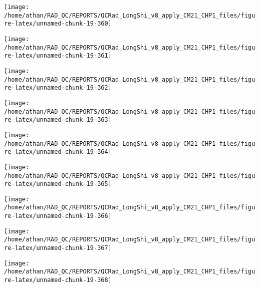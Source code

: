 \documentclass[
  10pt,
  a4paper,oneside]{article}
\begin{document}
\begin{center}\texttt{[image: /home/athan/RAD\_QC/REPORTS/QCRad\_LongShi\_v8\_apply\_CM21\_CHP1\_files/figure-latex/unnamed-chunk-19-360]} \end{center}

\begin{center}\texttt{[image: /home/athan/RAD\_QC/REPORTS/QCRad\_LongShi\_v8\_apply\_CM21\_CHP1\_files/figure-latex/unnamed-chunk-19-361]} \end{center}

\begin{center}\texttt{[image: /home/athan/RAD\_QC/REPORTS/QCRad\_LongShi\_v8\_apply\_CM21\_CHP1\_files/figure-latex/unnamed-chunk-19-362]} \end{center}

\begin{center}\texttt{[image: /home/athan/RAD\_QC/REPORTS/QCRad\_LongShi\_v8\_apply\_CM21\_CHP1\_files/figure-latex/unnamed-chunk-19-363]} \end{center}

\begin{center}\texttt{[image: /home/athan/RAD\_QC/REPORTS/QCRad\_LongShi\_v8\_apply\_CM21\_CHP1\_files/figure-latex/unnamed-chunk-19-364]} \end{center}

\begin{center}\texttt{[image: /home/athan/RAD\_QC/REPORTS/QCRad\_LongShi\_v8\_apply\_CM21\_CHP1\_files/figure-latex/unnamed-chunk-19-365]} \end{center}

\begin{center}\texttt{[image: /home/athan/RAD\_QC/REPORTS/QCRad\_LongShi\_v8\_apply\_CM21\_CHP1\_files/figure-latex/unnamed-chunk-19-366]} \end{center}

\begin{center}\texttt{[image: /home/athan/RAD\_QC/REPORTS/QCRad\_LongShi\_v8\_apply\_CM21\_CHP1\_files/figure-latex/unnamed-chunk-19-367]} \end{center}

\begin{center}\texttt{[image: /home/athan/RAD\_QC/REPORTS/QCRad\_LongShi\_v8\_apply\_CM21\_CHP1\_files/figure-latex/unnamed-chunk-19-368]} \end{center}
\end{document}
